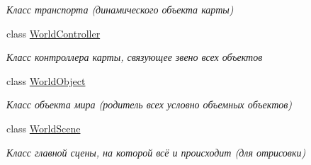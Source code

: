 \begin{DoxyCompactItemize}
\begin{DoxyCompactList}\small\item\em Класс транспорта (динамического объекта карты) \end{DoxyCompactList}\item 
class \hyperlink{classrtm_1_1_world_controller}{World\+Controller}
\begin{DoxyCompactList}\small\item\em Класс контроллера карты, связующее звено всех объектов \end{DoxyCompactList}\item 
class \hyperlink{classrtm_1_1_world_object}{World\+Object}
\begin{DoxyCompactList}\small\item\em Класс объекта мира (родитель всех условно объемных объектов) \end{DoxyCompactList}\item 
class \hyperlink{classrtm_1_1_world_scene}{World\+Scene}
\begin{DoxyCompactList}\small\item\em Класс главной сцены, на которой всё и происходит (для отрисовки) \end{DoxyCompactList}\end{DoxyCompactItemize}
